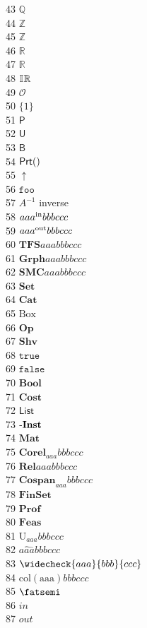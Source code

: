 \documentclass[11pt, book]{memoir}
\theoremstyle{plain}
\theoremstyle{plain}
\theoremstyle{remark}
\newcommand{\const}[1]{\mathtt{#1}}%
\newcommand{\Set}[1]{\mathrm{#1}}%
\newcommand{\Cat}[1]{\mathbf{#1}}%
\newcommand{\fun}[1]{\textit{#1}}%
\newcommand{\Fun}[1]{\mathsf{#1}}%
\newcommand{\tn}[1]{\textnormal{#1}}
\newcommand{\QQ}{\mathbb{Q}}
\newcommand{\ZZ}{\mathbb{Z}}
\newcommand{\zz}{\mathbb{Z}}
\newcommand{\RR}{\mathbb{R}}
\newcommand{\rr}{\mathbb{R}}
\newcommand{\IR}{\mathbb{I}\hspace{.6pt}\mathbb{R}}
\newcommand{\oo}{\mathcal{O}}
\newcommand{\singleton}{\{1\}}
\newcommand{\powset}{\Fun{P}}
\newcommand{\upset}{\Fun{U}}
\newcommand{\beh}{\Fun{B}}
\newcommand{\prt}[1]{\Fun{Prt}(#1)}
\newcommand{\upclose}{\mathop{\uparrow}}
\newcommand{\foo}{\const{foo}}
\newcommand{\inv}{^{-1}}
\newcommand{\inp}[1]{#1^\tn{in}}
\newcommand{\outp}[1]{#1^\tn{out}}
\newcommand{\TFS}{\Cat{TFS}}
\newcommand{\Grph}{\Cat{Grph}}
\newcommand{\SMC}{\Cat{SMC}}
\newcommand{\smset}{\Cat{Set}}
\newcommand{\smcat}{\Cat{Cat}}
\newcommand{\Bx}{\Set{Box}}
\newcommand{\Op}{\Cat{Op}}
\newcommand{\Shv}{\Cat{Shv}}
\newcommand{\true}{\const{true}}
\newcommand{\false}{\const{false}}
\newcommand{\Bool}{\Cat{Bool}}
\newcommand{\Cost}{\Cat{Cost}}
\newcommand{\List}{\Fun{List}}
\newcommand{\inst}{\tn{-}\Cat{Inst}}
\newcommand{\mat}{\Cat{Mat}}
\newcommand{\corel}[1]{\Cat{Corel}_{#1}}
\newcommand{\rel}{\Cat{Rel}}
\newcommand{\cospan}[1]{\Cat{Cospan}_{#1}}
\newcommand{\finset}{\Cat{FinSet}}
\newcommand{\Prof}{\Cat{Prof}}
\newcommand{\Feas}{\Cat{Feas}}
\newcommand{\Unit}[1]{\mathrm{U}_{#1}}
\newcommand{\comp}[1]{\widehat{#1}}
\newcommand{\conj}[1]{\widecheck{#1}}
\newcommand{\col}[1]{\mathrm{col(#1)}}
\newcommand{\cp}{\mathbin{\fatsemi}}
\newcommand{\pgin}{\fun{in}}
\newcommand{\pgout}{\fun{out}}
\newcommand{\?}{{\color{gray}{?}}}
\begin{document}
 43 $\QQ$ \\
 44 $\ZZ$ \\
 45 $\zz$ \\
 46 $\RR$ \\
 47 $\rr$ \\
 48 $\IR$ \\
 49 $\oo$ \\
 50 $\singleton$ \\
 51 $\powset$ \\
 52 $\upset$ \\
 53 $\beh$ \\
 54 $\prt$ \\
 55 $\upclose$ \\
 56 $\foo$ \\
 57 $A\inv$ inverse\\
 58 $\inp{aaa}{bbb}{ccc}$ \\
 59 $\outp{aaa}{bbb}{ccc}$ \\
 60 $\TFS{aaa}{bbb}{ccc}$ \\
 61 $\Grph{aaa}{bbb}{ccc}$ \\
 62 $\SMC{aaa}{bbb}{ccc}$ \\
 63 $\smset$ \\
 64 $\smcat$ \\
 65 $\Bx$ \\
 66 $\Op$ \\
 67 $\Shv$ \\
 68 $\true$ \\
 69 $\false$ \\
 70 $\Bool$ \\
 71 $\Cost$ \\
 72 $\List$ \\
 73 $\inst$ \\
 74 $\mat$ \\
 75 $\corel{aaa}{bbb}{ccc}$ \\
 76 $\rel{aaa}{bbb}{ccc}$ \\
 77 $\cospan{aaa}{bbb}{ccc}$ \\
 78 $\finset$ \\
 79 $\Prof$ \\
 80 $\Feas$ \\
 81 $\Unit{aaa}{bbb}{ccc}$ \\
 82 $\comp{aaa}{bbb}{ccc}$ \\
 83 $\conj{aaa}{bbb}{ccc}$ \\
 84 $\col{aaa}{bbb}{ccc}$ \\
 85 $\cp$ \\
 86 $\pgin$ \\
 87 $\pgout$ \\
\end{document}
